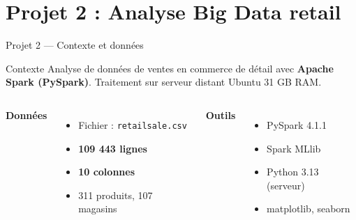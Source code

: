 \documentclass{beamer}
\begin{document}
\section{Projet 2 : Analyse Big Data retail}

\begin{frame}{Projet 2 --- Contexte et données}
  \begin{block}{Contexte}
    Analyse de données de ventes en commerce de détail avec \textbf{Apache Spark (PySpark)}.
    Traitement sur serveur distant Ubuntu 31 GB RAM.
  \end{block}

  \begin{columns}
    \textbf{Données}
    \begin{itemize}
      \item Fichier : \texttt{retailsale.csv}
      \item \textbf{109 443 lignes}
      \item \textbf{10 colonnes}
      \item 311 produits, 107 magasins
    \end{itemize}

    \textbf{Outils}
    \begin{itemize}
      \item PySpark 4.1.1
      \item Spark MLlib
      \item Python 3.13 (serveur)
      \item matplotlib, seaborn
    \end{itemize}
  \end{columns}
\end{frame}
\end{document}
